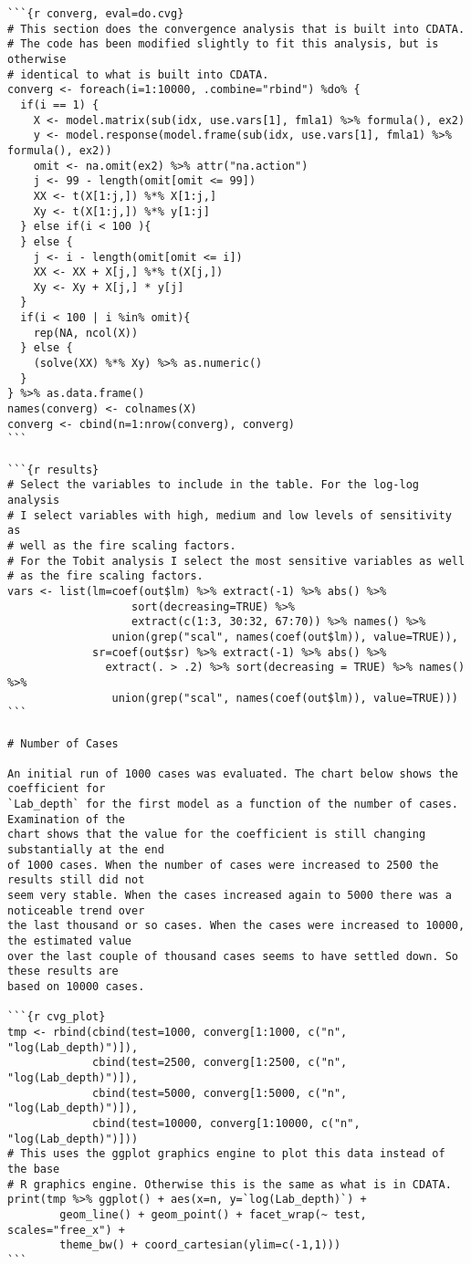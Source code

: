 \begin{lstlisting}[basicstyle=\scriptsize]
```{r converg, eval=do.cvg}
# This section does the convergence analysis that is built into CDATA.
# The code has been modified slightly to fit this analysis, but is otherwise
# identical to what is built into CDATA.
converg <- foreach(i=1:10000, .combine="rbind") %do% {
  if(i == 1) {
    X <- model.matrix(sub(idx, use.vars[1], fmla1) %>% formula(), ex2)
    y <- model.response(model.frame(sub(idx, use.vars[1], fmla1) %>% formula(), ex2))
    omit <- na.omit(ex2) %>% attr("na.action")
    j <- 99 - length(omit[omit <= 99])
    XX <- t(X[1:j,]) %*% X[1:j,]
    Xy <- t(X[1:j,]) %*% y[1:j]
  } else if(i < 100 ){
  } else {
    j <- i - length(omit[omit <= i])
    XX <- XX + X[j,] %*% t(X[j,])
    Xy <- Xy + X[j,] * y[j]
  }
  if(i < 100 | i %in% omit){
    rep(NA, ncol(X))
  } else {
    (solve(XX) %*% Xy) %>% as.numeric()
  }
} %>% as.data.frame()
names(converg) <- colnames(X)
converg <- cbind(n=1:nrow(converg), converg)
```

```{r results}
# Select the variables to include in the table. For the log-log analysis
# I select variables with high, medium and low levels of sensitivity as
# well as the fire scaling factors.
# For the Tobit analysis I select the most sensitive variables as well
# as the fire scaling factors.
vars <- list(lm=coef(out$lm) %>% extract(-1) %>% abs() %>%
                   sort(decreasing=TRUE) %>%
                   extract(c(1:3, 30:32, 67:70)) %>% names() %>%
                union(grep("scal", names(coef(out$lm)), value=TRUE)),
             sr=coef(out$sr) %>% extract(-1) %>% abs() %>%
               extract(. > .2) %>% sort(decreasing = TRUE) %>% names() %>%
                union(grep("scal", names(coef(out$lm)), value=TRUE)))
```

# Number of Cases

An initial run of 1000 cases was evaluated. The chart below shows the coefficient for
`Lab_depth` for the first model as a function of the number of cases. Examination of the
chart shows that the value for the coefficient is still changing substantially at the end
of 1000 cases. When the number of cases were increased to 2500 the results still did not
seem very stable. When the cases increased again to 5000 there was a noticeable trend over
the last thousand or so cases. When the cases were increased to 10000, the estimated value
over the last couple of thousand cases seems to have settled down. So these results are
based on 10000 cases.

```{r cvg_plot}
tmp <- rbind(cbind(test=1000, converg[1:1000, c("n", "log(Lab_depth)")]),
             cbind(test=2500, converg[1:2500, c("n", "log(Lab_depth)")]),
             cbind(test=5000, converg[1:5000, c("n", "log(Lab_depth)")]),
             cbind(test=10000, converg[1:10000, c("n", "log(Lab_depth)")]))
# This uses the ggplot graphics engine to plot this data instead of the base
# R graphics engine. Otherwise this is the same as what is in CDATA.
print(tmp %>% ggplot() + aes(x=n, y=`log(Lab_depth)`) +
        geom_line() + geom_point() + facet_wrap(~ test, scales="free_x") +
        theme_bw() + coord_cartesian(ylim=c(-1,1)))
```


\end{lstlisting}
